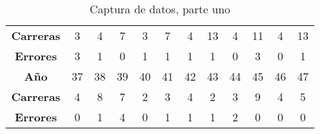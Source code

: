\begin{table}[h!]
\begin{tabular}{cccccccccccc}
        \textbf{Carreras}                  & 3                       & 4                       & 7                       & 3                       & 7                       & 4                       & 13                      & 4                       & 11                      & 4                       & 13                      \\
        \textbf{Errores}                   & 3                       & 1                       & 0                       & 1                       & 1                       & 1                       & 1                       & 0                       & 3                       & 0                       & 1                       \\ \hline
        \multicolumn{1}{|c|}{\textbf{Año}} & \multicolumn{1}{c|}{37} & \multicolumn{1}{c|}{38} & \multicolumn{1}{c|}{39} & \multicolumn{1}{c|}{40} & \multicolumn{1}{c|}{41} & \multicolumn{1}{c|}{42} & \multicolumn{1}{c|}{43} & \multicolumn{1}{c|}{44} & \multicolumn{1}{c|}{45} & \multicolumn{1}{c|}{46} & \multicolumn{1}{c|}{47} \\ \hline
        \textbf{Carreras}                  & 4                       & 8                       & 7                       & 2                       & 3                       & 4                       & 2                       & 3                       & 9                       & 4                       & 5                       \\
        \textbf{Errores}                   & 0                       & 1                       & 4                       & 0                       & 1                       & 1                       & 1                       & 2                       & 0                       & 0                       & 0
    \end{tabular}
    \caption{Captura de datos, parte uno}
    \label{tabme2}
\end{table}

